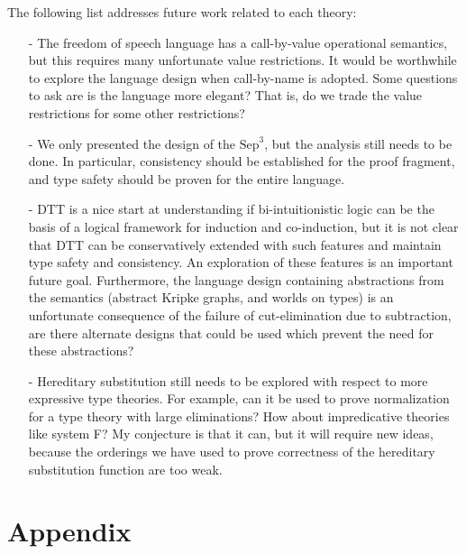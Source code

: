 \documentclass[phd,appendix,dedicationpage,ackpage,epigraphpage,figures]{uithesis}
\newcommand{\Sep}[0]{\text{Sep}^3}
\begin{document}
The following list addresses future work related to each theory:
\begin{itemize}
\item[-] The freedom of speech language has a call-by-value
  operational semantics, but this requires many unfortunate value
  restrictions.  It would be worthwhile to explore the language design
  when call-by-name is adopted.  Some questions to ask are is the
  language more elegant?  That is, do we trade the value restrictions
  for some other restrictions?

\item[-] We only presented the design of the $\Sep$, but the analysis
  still needs to be done.  In particular, consistency should be
  established for the proof fragment, and type safety should be proven
  for the entire language.

\item[-] DTT is a nice start at understanding if bi-intuitionistic
  logic can be the basis of a logical framework for induction and
  co-induction, but it is not clear that DTT can be conservatively
  extended with such features and maintain type safety and
  consistency.  An exploration of these features is an important
  future goal.  Furthermore, the language design containing
  abstractions from the semantics (abstract Kripke graphs, and worlds
  on types) is an unfortunate consequence of the failure of
  cut-elimination due to subtraction, are there alternate designs that
  could be used which prevent the need for these abstractions?

\item[-] Hereditary substitution still needs to be explored with
  respect to more expressive type theories.  For example, can it be
  used to prove normalization for a type theory with large
  eliminations?  How about impredicative theories like system F?  My
  conjecture is that it can, but it will require new ideas, because
  the orderings we have used to prove correctness of the hereditary
  substitution function are too weak.
\end{itemize}



\chapter*{Appendix}
\end{document}
